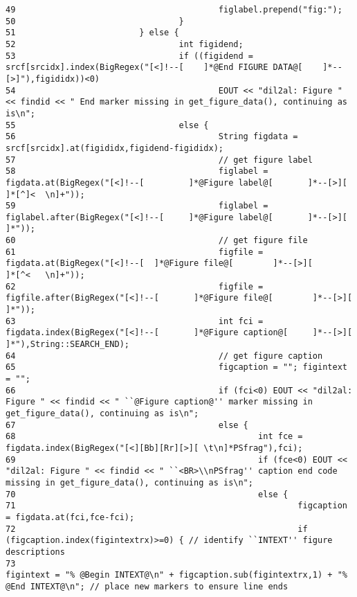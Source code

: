 \begin{verbatim}
49                                         figlabel.prepend("fig:");
50                                 }
51                         } else {
52                                 int figidend;
53                                 if ((figidend = srcf[srcidx].index(BigRegex("[<]!--[    ]*@End FIGURE DATA@[    ]*--[>]"),figididx))<0)
54                                         EOUT << "dil2al: Figure " << findid << " End marker missing in get_figure_data(), continuing as is\n";
55                                 else {
56                                         String figdata = srcf[srcidx].at(figididx,figidend-figididx);
57                                         // get figure label
58                                         figlabel = figdata.at(BigRegex("[<]!--[         ]*@Figure label@[       ]*--[>][        ]*[^]<  \n]+"));
59                                         figlabel = figlabel.after(BigRegex("[<]!--[     ]*@Figure label@[       ]*--[>][        ]*"));
60                                         // get figure file
61                                         figfile = figdata.at(BigRegex("[<]!--[  ]*@Figure file@[        ]*--[>][        ]*[^<   \n]+"));
62                                         figfile = figfile.after(BigRegex("[<]!--[       ]*@Figure file@[        ]*--[>][        ]*"));
63                                         int fci = figdata.index(BigRegex("[<]!--[       ]*@Figure caption@[     ]*--[>][        ]*"),String::SEARCH_END);
64                                         // get figure caption
65                                         figcaption = ""; figintext = "";
66                                         if (fci<0) EOUT << "dil2al: Figure " << findid << " ``@Figure caption@'' marker missing in get_figure_data(), continuing as is\n";
67                                         else {
68                                                 int fce = figdata.index(BigRegex("[<][Bb][Rr][>][ \t\n]*PSfrag"),fci);
69                                                 if (fce<0) EOUT << "dil2al: Figure " << findid << " ``<BR>\\nPSfrag'' caption end code missing in get_figure_data(), continuing as is\n";
70                                                 else {
71                                                         figcaption = figdata.at(fci,fce-fci);
72                                                         if (figcaption.index(figintextrx)>=0) { // identify ``INTEXT'' figure descriptions
73                                                                 figintext = "% @Begin INTEXT@\n" + figcaption.sub(figintextrx,1) + "% @End INTEXT@\n"; // place new markers to ensure line ends

\end{verbatim}
